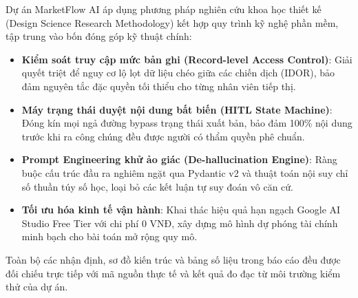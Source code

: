 Dự án MarketFlow AI áp dụng phương pháp nghiên cứu khoa học thiết kế (Design Science Research Methodology) kết hợp quy trình kỹ nghệ phần mềm, tập trung vào bốn đóng góp kỹ thuật chính:
\begin{itemize}[noitemsep,topsep=2pt]
  \item \textbf{Kiểm soát truy cập mức bản ghi (Record-level Access Control)}: Giải quyết triệt để nguy cơ lộ lọt dữ liệu chéo giữa các chiến dịch (IDOR), bảo đảm nguyên tắc đặc quyền tối thiểu cho từng nhân viên tiếp thị.
  \item \textbf{Máy trạng thái duyệt nội dung bất biến (HITL State Machine)}: Đóng kín mọi ngả đường bypass trạng thái xuất bản, bảo đảm 100\% nội dung trước khi ra công chúng đều được người có thẩm quyền phê chuẩn.
  \item \textbf{Prompt Engineering khử ảo giác (De-hallucination Engine)}: Ràng buộc cấu trúc đầu ra nghiêm ngặt qua Pydantic v2 và thuật toán nội suy chỉ số thuần túy số học, loại bỏ các kết luận tự suy đoán vô căn cứ.
  \item \textbf{Tối ưu hóa kinh tế vận hành}: Khai thác hiệu quả hạn ngạch Google AI Studio Free Tier với chi phí 0 VNĐ, xây dựng mô hình dự phóng tài chính minh bạch cho bài toán mở rộng quy mô.
\end{itemize}

Toàn bộ các nhận định, sơ đồ kiến trúc và bảng số liệu trong báo cáo đều được đối chiếu trực tiếp với mã nguồn thực tế và kết quả đo đạc từ môi trường kiểm thử của dự án.
